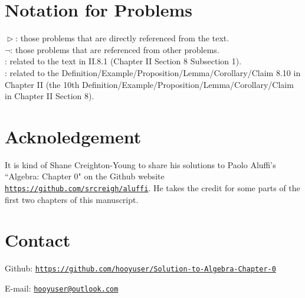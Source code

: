 \documentclass[12pt,letterpaper,boxed]{hmcpset}
\renewcommand\appendix{\setcounter{secnumdepth}{-2}}
\begin{document}
\thispagestyle{empty}
\vspace{-5em}	
\rightline{\today}
\vspace*{1.5em}	

\tableofcontents
\thispagestyle{empty}
\appendix

\newpage
\thispagestyle{empty}
\section*{Notation for Problems}
$\vartriangleright$: those problems that are directly referenced from the text.\\

\noindent $\neg$: those problems that are referenced from other
problems.\\

\noindent [\textsection II.8.1]: related to the text in  II.8.1 (Chapter II Section 8 Subsection 1).\\

\noindent [II.8.10]: related to the Definition/Example/Proposition/Lemma/Corollary/Claim 8.10 in Chapter II (the 10th Definition/Example/Proposition/Lemma/Corollary/Claim in Chapter II Section 8).

\section*{Acknoledgement}
It is kind of Shane Creighton-Young to share his solutions to Paolo Aluffi's ``Algebra: Chapter 0"\cite{aluffi2009algebra} on the Github website \href{https://github.com/srcreigh/aluffi}{\texttt{https://github.com/srcreigh/aluffi}}. He takes the credit for some parts of the first two chapters of this manuscript. 

\section*{Contact}
Github:
\href{https://github.com/hooyuser/Solution-to-Algebra-Chapter-0}{\texttt{https://github.com/hooyuser/Solution-to-Algebra-Chapter-0}} 

\noindent E-mail: \href{mailto:hooyuser@outlook.com}{\texttt{hooyuser@outlook.com}}
\end{document}
